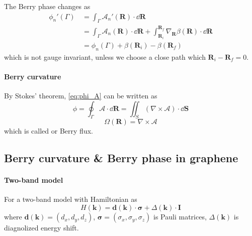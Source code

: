 \documentclass[12pt,a4paper]{article}
\begin{document}
    The Berry phase changes as
    \[\begin{aligned}
        \phi_n'(\Gamma)
        &\, = \int_{\Gamma} \mathcal{A}_n'(\mathbf{R}) \cdot \dd \mathbf{R} \\
        &\, = \int_{\Gamma} \mathcal{A}_n(\mathbf{R}) \cdot \dd \mathbf{R}
        + \int_{\mathbf{R}_i}^{\mathbf{R}_f} \nabla_{\mathbf{R}} \beta(\mathbf{R}) \cdot \dd \mathbf{R} \\
        &\, = \phi_n(\Gamma) + \beta(\mathbf{R}_i) - \beta(\mathbf{R}_f)
    \end{aligned}\]
    which is not gauge invariant, unless we choose a close path which $\mathbf{R}_i - \mathbf{R}_f = 0$.

\paragraph{Berry curvature}

    By Stokes' theorem, \eqref{eq:phi_A} can be written as
    \[\phi = \oint_{\Gamma} \mathcal{A} \cdot \dd \mathbf{R}
    = \iint_S \left(\nabla\times \mathcal{A}\right) \cdot \dd \mathbf{S}\]
    \begin{equation}
    \label{eq:curvature}
        \Omega(\mathbf{R}) = \nabla\times \mathcal{A}
    \end{equation}
    which is called  or Berry flux.



\subsection{Berry curvature \& Berry phase in graphene}

\paragraph{Two-band model}

    For a two-band model with Hamiltonian as
    \begin{equation}
    \label{eq:H}
        H(\mathbf{k}) = \mathbf{d}(\mathbf{k}) \cdot \bm{\sigma} + \Delta(\mathbf{k}) \cdot \mathbf{I}
    \end{equation}
    where $\mathbf{d}(\mathbf{k}) = \left(d_x, d_y, d_z\right)$, $\bm{\sigma} = \left(\sigma_x, \sigma_y, \sigma_z\right)$ is Pauli matrices, $\Delta(\mathbf{k})$ is diagnolized energy shift.
\end{document}
